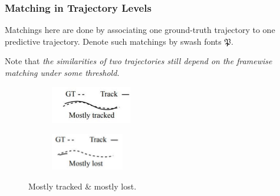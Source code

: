 \documentclass[slidetop, mathserif]{beamer}
\begin{document}
\begin{frame}
	\frametitle{Matching in Trajectory Levels}
	    
	Matchings here are done by associating one ground-truth trajectory
	to one predictive trajectory.
	Denote such matchings by swash fonts $\mathfrak P$.
	    
	\quad
	
	Note that \emph{the similarities of two trajectories still depend on the
	framewise matching under some threshold.}
	\begin{figure}
		\begin{subfigure}{.5\textwidth}
			\centering
			\includegraphics[width=100pt]{pics/fig4.png}
		\end{subfigure}%
		\begin{subfigure}{.5\textwidth}
			\centering
			\includegraphics[width=90pt]{pics/fig5.png}
		\end{subfigure}
		\caption{Mostly tracked \& mostly lost.}
	\end{figure}
	
\end{frame}
\end{document}
